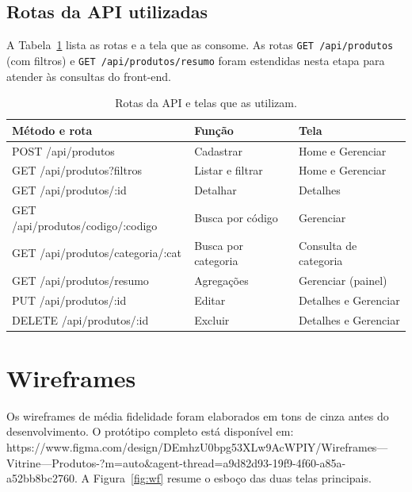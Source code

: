 \documentclass[12pt]{article}
\begin{document}
\subsection{Rotas da API utilizadas}

A Tabela~\ref{tab:rotas} lista as rotas e a tela que as consome. As rotas \texttt{GET /api/produtos} (com filtros) e \texttt{GET /api/produtos/resumo} foram estendidas nesta etapa para atender às consultas do front-end.

\begin{table}[ht]
\centering
\caption{Rotas da API e telas que as utilizam.}\label{tab:rotas}
\small
\begin{tabular}{llp{3.2cm}}
\toprule
\textbf{Método e rota} & \textbf{Função} & \textbf{Tela}\\
\midrule
POST /api/produtos & Cadastrar & Home e Gerenciar\\
GET /api/produtos?filtros & Listar e filtrar & Home e Gerenciar\\
GET /api/produtos/:id & Detalhar & Detalhes\\
GET /api/produtos/codigo/:codigo & Busca por código & Gerenciar\\
GET /api/produtos/categoria/:cat & Busca por categoria & Consulta de categoria\\
GET /api/produtos/resumo & Agregações & Gerenciar (painel)\\
PUT /api/produtos/:id & Editar & Detalhes e Gerenciar\\
DELETE /api/produtos/:id & Excluir & Detalhes e Gerenciar\\
\bottomrule
\end{tabular}
\end{table}

\section{Wireframes}

Os wireframes de média fidelidade foram elaborados em tons de cinza antes do desenvolvimento. O protótipo completo está disponível em: https://www.figma.com/design/DEmhzU0bpg53XLw9AcWPIY/Wireframes---Vitrine---Produtos-?m=auto&agent-thread=a9d82d93-19f9-4f60-a85a-a52bb8bc2760. A Figura~\ref{fig:wf} resume o esboço das duas telas principais.
\end{document}
